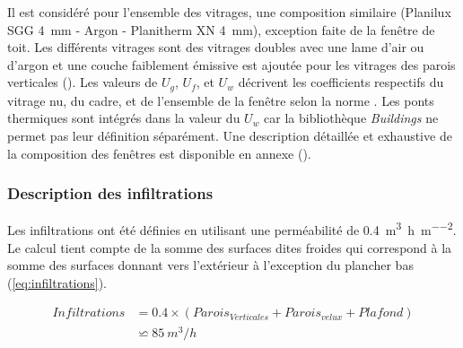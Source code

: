 Il est considéré pour l’ensemble des vitrages, une composition similaire
(Planilux SGG \SI{4}{mm} - Argon - Planitherm XN \SI{4}{mm}), exception faite de
la fenêtre de toit. Les différents vitrages sont des vitrages doubles avec une
lame d’air ou d’argon et une couche faiblement émissive est ajoutée pour les
vitrages des parois verticales (). Les valeurs de
$U_{g}$, $U_{f}$, et $U_{w}$ décrivent les coefficients respectifs du vitrage
nu, du cadre, et de l’ensemble de la fenêtre selon la norme . Les ponts thermiques sont intégrés dans la valeur du $U_{w}$ car la
bibliothèque \textit{Buildings} ne permet pas leur définition séparément. Une
description détaillée et exhaustive de la composition des fenêtres est
disponible en annexe ().


\subsubsection{Description des infiltrations} %
\label{ssub:description_des_infiltrations}
Les infiltrations ont été définies en utilisant une perméabilité de
\SI{0.4}{m^{3}\per\hour\per\meter\squared}. Le calcul tient compte de la
somme des surfaces dites froides qui correspond à la somme des surfaces donnant
vers l’extérieur à l’exception du plancher bas (\eqref{eq:infiltrations}).

\begin{align}
    Infiltrations &= 0.4 \times (Parois_{Verticales} + Parois_{velux} + Plafond)\\
    &              \backsimeq 85~\si{m^{3}/h}
    \label{eq:infiltrations}
\end{align}


